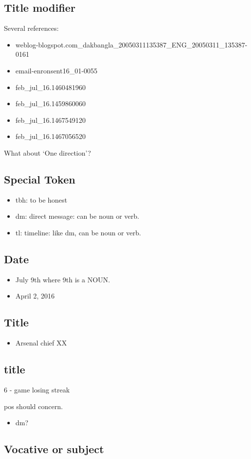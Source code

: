 \documentclass[11pt,a4paper]{article}
\begin{document}
\subsection{Title modifier}
Several references:
\begin{itemize}
	\item weblog-blogspot.com\_dakbangla\_20050311135387\_ENG\_20050311\_135387-0161
	\item email-enronsent16\_01-0055
\end{itemize}
\begin{itemize}
	\item feb\_jul\_16.1460481960
	\item feb\_jul\_16.1459860060
	\item feb\_jul\_16.1467549120
	\item feb\_jul\_16.1467056520
\end{itemize}

What about `One direction'?


\subsection{Special Token}
\begin{itemize}
	\item tbh: to be honest
	\item dm: direct message: can be noun or verb.
	\item tl: timeline: like dm, can be noun or verb.
\end{itemize}

\subsection{Date}
\begin{itemize}
	\item July 9th where 9th is a NOUN.
	\item April 2, 2016
\end{itemize}

\subsection{Title}
\begin{itemize}
	\item Arsenal chief XX
\end{itemize}

\subsection{title}
6 - game losing streak

pos should concern.
\begin{itemize}
	\item dm?
\end{itemize}

\subsection{Vocative or subject}
\end{document}

